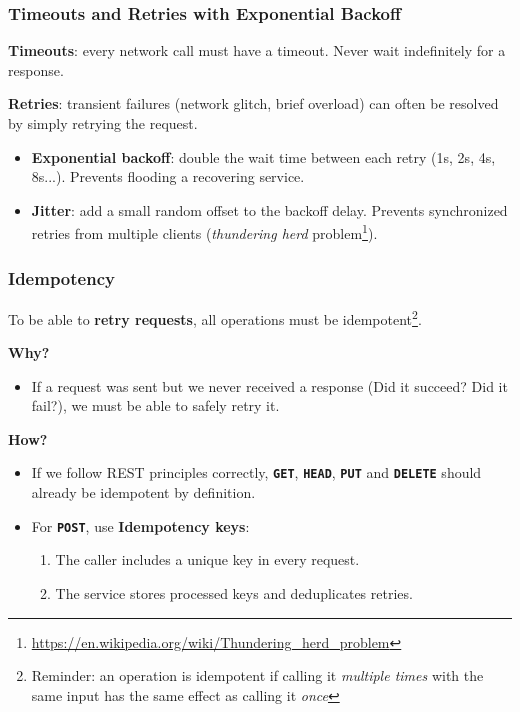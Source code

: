 \documentclass{beamer}
\begin{document}
\begin{frame}
  \frametitle{Timeouts and Retries with Exponential Backoff}

  \textbf{Timeouts}: every network call must have a timeout. Never wait indefinitely for a response.
  \newline

  \textbf{Retries}: transient failures (network glitch, brief overload) can often be resolved by simply retrying the request.
  \begin{itemize}
    \item \textbf{Exponential backoff}: double the wait time between each retry (1s, 2s, 4s, 8s...). Prevents flooding a recovering service.
    \item \textbf{Jitter}: add a small random offset to the backoff delay. Prevents synchronized retries from multiple clients (\textit{thundering herd} problem\footnote{\url{https://en.wikipedia.org/wiki/Thundering_herd_problem}}).
  \end{itemize}

\end{frame}

\begin{frame}
  \frametitle{Idempotency}

  To be able to \textbf{retry requests}, all operations must be idempotent\footnote{Reminder: an operation is idempotent if calling it \textit{multiple times} with the same input has the same effect as calling it \textit{once}}.
  \newline

  \textbf{Why?}
  \begin{itemize}
    \item If a request was sent but we never received a response (Did it succeed? Did it fail?), we must be able to safely retry it.
  \end{itemize}

  \textbf{How?}
  \begin{itemize}
    \item If we follow REST principles correctly, \texttt{\textbf{GET}}, \texttt{\textbf{HEAD}}, \texttt{\textbf{PUT}} and \texttt{\textbf{DELETE}} should already be idempotent by definition.
    \item For \texttt{\textbf{POST}}, use \textbf{Idempotency keys}:
    \begin{enumerate}
      \item The caller includes a unique key in every request.
      \item The service stores processed keys and deduplicates retries.
    \end{enumerate}
  \end{itemize}

\end{frame}
\end{document}
